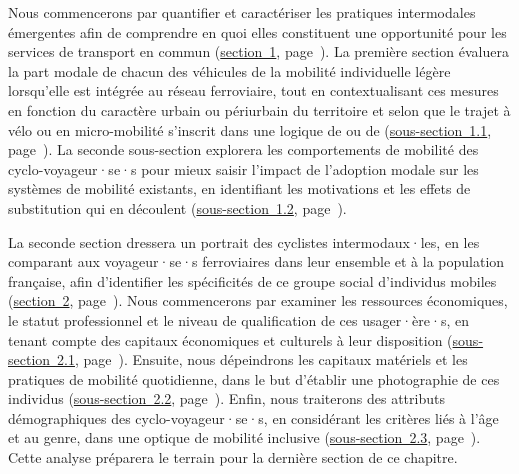 \begin{refsegment}
Nous commencerons par quantifier et caractériser les pratiques intermodales émergentes afin de comprendre en quoi elles constituent une opportunité pour les services de transport en commun (\hyperref[section-chap4:progression-velo-micromobilite-aubaine]{section~1}, page~\pageref{section-chap4:progression-velo-micromobilite-aubaine}). La première section évaluera la part modale de chacun des véhicules de la mobilité individuelle légère lorsqu'elle est intégrée au réseau ferroviaire, tout en contextualisant ces mesures en fonction du caractère urbain ou \gls{périurbain} du territoire et selon que le trajet à vélo ou en micro-mobilité s'inscrit dans une logique de  ou de  (\hyperref[chap4:proportion-croissante-voyageurs-intermodaux]{sous-section~1.1}, page~\pageref{chap4:proportion-croissante-voyageurs-intermodaux}). La seconde sous-section explorera les comportements de mobilité des cyclo-voyageur·se·s pour mieux saisir l'impact de l'adoption modale sur les systèmes de mobilité existants, en identifiant les motivations et les effets de substitution qui en découlent (\hyperref[chap4:comportements-mobilite]{sous-section~1.2}, page~\pageref{chap4:comportements-mobilite}).%

La seconde section dressera un portrait des cyclistes intermodaux·les, en les comparant aux voyageur·se·s ferroviaires dans leur ensemble et à la population française, afin d'identifier les spécificités de ce groupe social d'individus mobiles (\hyperref[section-chap4:profil-sociodemographique]{section~2}, page~\pageref{section-chap4:profil-sociodemographique}). Nous commencerons par examiner les ressources économiques, le statut professionnel et le niveau de qualification de ces usager·ère·s, en tenant compte des capitaux économiques et culturels à leur disposition (\hyperref[chap4:capital-economique-culturel]{sous-section~2.1}, page~\pageref{chap4:capital-economique-culturel}). Ensuite, nous dépeindrons les capitaux matériels et les pratiques de mobilité quotidienne, dans le but d'établir une photographie de ces individus (\hyperref[chap4:capital-mobilite]{sous-section~2.2}, page~\pageref{chap4:capital-mobilite}). Enfin, nous traiterons des attributs démographiques des cyclo-voyageur·se·s, en considérant les critères liés à l'âge et au \gls{genre}, dans une optique de mobilité inclusive (\hyperref[chap4:demographie]{sous-section~2.3}, page~\pageref{chap4:demographie}). Cette analyse préparera le terrain pour la dernière section de ce chapitre.


\end{refsegment}
